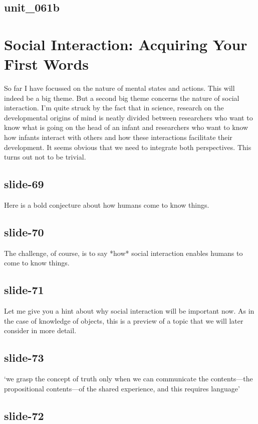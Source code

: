 \documentclass[12pt,\papersize]{extarticle}
\begin{document}
\subsection{unit\_061b}


\section{Social Interaction: Acquiring Your First Words}

So far I have focussed on the nature of mental states and actions.
This will indeed be a big theme.
But a second big theme concerns the nature of social interaction.
I’m quite struck by the fact that in science, research on the
developmental origins of mind is neatly divided between researchers
who want to know what is going on the head of an infant
and researchers who want to know how infants interact with others and
how these interactions facilitate their development.
It seems obvious that we need to integrate both perspectives.
This turns out not to be trivial.

\subsection{slide-69}
Here is a bold conjecture about how humans come to know things.

\subsection{slide-70}
The challenge, of course, is to say *how* social interaction enables humans to come to
know things.

\subsection{slide-71}
Let me give you a hint about why social interaction will be important now.
As in the case of knowledge of objects, this is a preview of a topic
that we will later consider in more detail.

\subsection{slide-73}
‘we grasp the concept of truth only when we can communicate the
contents---the propositional contents---of the shared experience, and
this requires language’

\subsection{slide-72}
\end{document}
